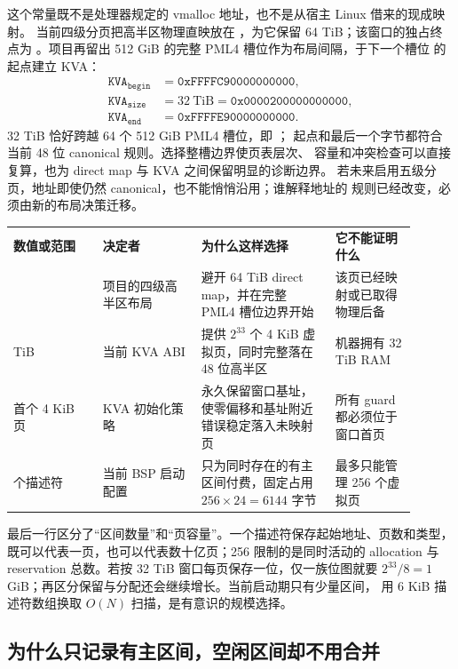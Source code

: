 这个常量既不是处理器规定的 vmalloc 地址，也不是从宿主 Linux 借来的现成映射。
当前四级分页把高半区物理直映放在 ，为它保留
64 TiB；该窗口的独占终点为 。项目再留出
512 GiB 的完整 PML4 槽位作为布局间隔，于下一个槽位
 的起点建立 KVA：
\[
\begin{aligned}
  \mathtt{KVA_{begin}} &= \mathtt{0xFFFFC90000000000},\\
  \mathtt{KVA_{size}}  &= 32\ \mathrm{TiB}
                         =\mathtt{0x0000200000000000},\\
  \mathtt{KVA_{end}}   &= \mathtt{0xFFFFE90000000000}.
\end{aligned}
\]
32 TiB 恰好跨越 64 个 512 GiB PML4 槽位，即 ；
起点和最后一个字节都符合当前 48 位 canonical 规则。选择整槽边界使页表层次、
容量和冲突检查可以直接复算，也为 direct map 与 KVA 之间保留明显的诊断边界。
若未来启用五级分页，地址即使仍然 canonical，也不能悄悄沿用；谁解释地址的
规则已经改变，必须由新的布局决策迁移。

\begin{longtable}{|L{0.20\linewidth}|L{0.22\linewidth}|L{0.30\linewidth}|L{0.18\linewidth}|}
\hline
{}
\textbf{数值或范围} & \textbf{决定者} & \textbf{为什么这样选择} &
\textbf{它不能证明什么} \\\tablerowrule
\endhead
{} & 项目的四级高半区布局 &
避开 64 TiB direct map，并在完整 PML4 槽位边界开始 &
该页已经映射或已取得物理后备 \\ TiB & 当前 KVA ABI &
提供 \(2^{33}\) 个 4 KiB 虚拟页，同时完整落在 48 位高半区 &
机器拥有 32 TiB RAM \\\tablerowrule
首个 4 KiB 页 & KVA 初始化策略 &
永久保留窗口基址，使零偏移和基址附近错误稳定落入未映射页 &
所有 guard 都必须位于窗口首页 \\ 个描述符 & 当前 BSP 启动配置 &
只为同时存在的有主区间付费，固定占用 \(256\times24=6144\) 字节 &
最多只能管理 256 个虚拟页 \\\hline
\end{longtable}

最后一行区分了“区间数量”和“页容量”。一个描述符保存起始地址、页数和类型，
既可以代表一页，也可以代表数十亿页；256 限制的是同时活动的 allocation 与
reservation 总数。若按 32 TiB 窗口每页保存一位，仅一族位图就要
\(2^{33}/8=1\) GiB；再区分保留与分配还会继续增长。当前启动期只有少量区间，
用 6 KiB 描述符数组换取 \(O(N)\) 扫描，是有意识的规模选择。

\subsection{为什么只记录有主区间，空闲区间却不用合并}

